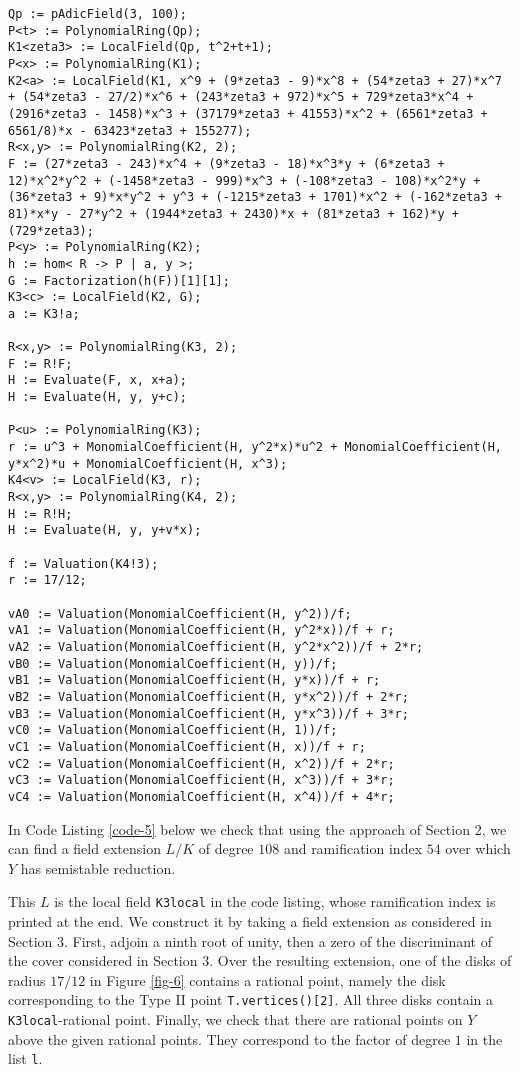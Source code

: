 \documentclass[11pt]{amsart}
\theoremstyle{definition}
\begin{document}
\begin{lstlisting}[language=Magma, label={code-4}, caption=Magma program. Used to compute wild topological branch locus and induced map on special fibers]
Qp := pAdicField(3, 100);
P<t> := PolynomialRing(Qp);
K1<zeta3> := LocalField(Qp, t^2+t+1);
P<x> := PolynomialRing(K1);
K2<a> := LocalField(K1, x^9 + (9*zeta3 - 9)*x^8 + (54*zeta3 + 27)*x^7 + (54*zeta3 - 27/2)*x^6 + (243*zeta3 + 972)*x^5 + 729*zeta3*x^4 + (2916*zeta3 - 1458)*x^3 + (37179*zeta3 + 41553)*x^2 + (6561*zeta3 + 6561/8)*x - 63423*zeta3 + 155277);
R<x,y> := PolynomialRing(K2, 2);
F := (27*zeta3 - 243)*x^4 + (9*zeta3 - 18)*x^3*y + (6*zeta3 + 12)*x^2*y^2 + (-1458*zeta3 - 999)*x^3 + (-108*zeta3 - 108)*x^2*y + (36*zeta3 + 9)*x*y^2 + y^3 + (-1215*zeta3 + 1701)*x^2 + (-162*zeta3 + 81)*x*y - 27*y^2 + (1944*zeta3 + 2430)*x + (81*zeta3 + 162)*y + (729*zeta3);
P<y> := PolynomialRing(K2);
h := hom< R -> P | a, y >;
G := Factorization(h(F))[1][1];
K3<c> := LocalField(K2, G);
a := K3!a;

R<x,y> := PolynomialRing(K3, 2);
F := R!F;
H := Evaluate(F, x, x+a);
H := Evaluate(H, y, y+c);

P<u> := PolynomialRing(K3);
r := u^3 + MonomialCoefficient(H, y^2*x)*u^2 + MonomialCoefficient(H, y*x^2)*u + MonomialCoefficient(H, x^3);
K4<v> := LocalField(K3, r);
R<x,y> := PolynomialRing(K4, 2);
H := R!H;
H := Evaluate(H, y, y+v*x);

f := Valuation(K4!3);
r := 17/12;

vA0 := Valuation(MonomialCoefficient(H, y^2))/f;
vA1 := Valuation(MonomialCoefficient(H, y^2*x))/f + r;
vA2 := Valuation(MonomialCoefficient(H, y^2*x^2))/f + 2*r;
vB0 := Valuation(MonomialCoefficient(H, y))/f;
vB1 := Valuation(MonomialCoefficient(H, y*x))/f + r;
vB2 := Valuation(MonomialCoefficient(H, y*x^2))/f + 2*r;
vB3 := Valuation(MonomialCoefficient(H, y*x^3))/f + 3*r;
vC0 := Valuation(MonomialCoefficient(H, 1))/f;
vC1 := Valuation(MonomialCoefficient(H, x))/f + r;
vC2 := Valuation(MonomialCoefficient(H, x^2))/f + 2*r;
vC3 := Valuation(MonomialCoefficient(H, x^3))/f + 3*r;
vC4 := Valuation(MonomialCoefficient(H, x^4))/f + 4*r;
\end{lstlisting}

In Code Listing \ref{code-5} below we check that using the approach of Section 2, we can find a field extension $L/K$ of degree $108$ and ramification index $54$ over which $Y$ has semistable reduction.

This $L$ is the local field \texttt{K3local} in the code listing, whose ramification index is printed at the end. We construct it by taking a field extension as considered in Section 3. First, adjoin a ninth root of unity, then a zero of the discriminant of the cover considered in Section 3. Over the resulting extension, one of the disks of radius $17/12$ in Figure \ref{fig-6} contains a rational point, namely the disk corresponding to the Type II point \texttt{T.vertices()[2]}. All three disks contain a \texttt{K3local}-rational point. Finally, we check that there are rational points on $Y$ above the given rational points. They correspond to the factor of degree $1$ in the list \texttt{l}.
\end{document}
